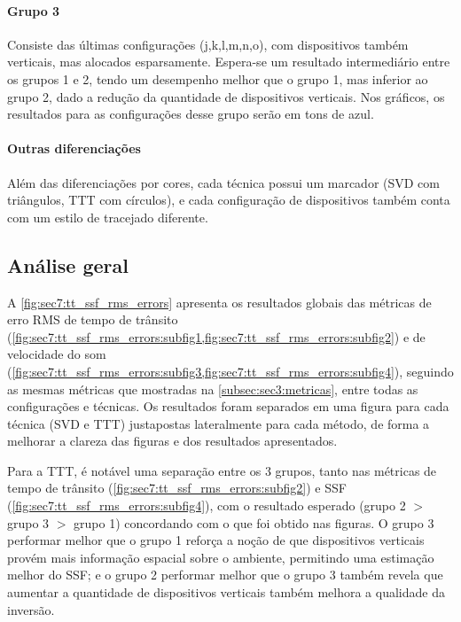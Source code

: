 \paragraph{Grupo 3}
Consiste das últimas configurações (j,k,l,m,n,o), com dispositivos também verticais, mas alocados esparsamente. Espera-se um resultado intermediário entre os grupos 1 e 2, tendo um desempenho melhor que o grupo 1, mas inferior ao grupo 2, dado a redução da quantidade de dispositivos verticais. Nos gráficos, os resultados para as configurações desse grupo serão em tons de azul.

\paragraph{Outras diferenciações}

Além das diferenciações por cores, cada técnica possui um marcador (SVD com triângulos, TTT com círculos), e cada configuração de dispositivos também conta com um estilo de tracejado diferente.

\subsection{Análise geral}

A \cref{fig:sec7:tt_ssf_rms_errors} apresenta os resultados globais das métricas de erro RMS de tempo de trânsito (\cref{fig:sec7:tt_ssf_rms_errors:subfig1,fig:sec7:tt_ssf_rms_errors:subfig2}) e de velocidade do som (\cref{fig:sec7:tt_ssf_rms_errors:subfig3,fig:sec7:tt_ssf_rms_errors:subfig4}), seguindo as mesmas métricas que mostradas na \cref{subsec:sec3:metricas}, entre todas as configurações e técnicas. Os resultados foram separados em uma figura para cada técnica (SVD e TTT) justapostas lateralmente para cada método, de forma a melhorar a clareza das figuras e dos resultados apresentados.


%
\const Para a TTT, é notável uma separação entre os 3 grupos, tanto nas métricas de tempo de trânsito (\cref{fig:sec7:tt_ssf_rms_errors:subfig2}) e SSF (\cref{fig:sec7:tt_ssf_rms_errors:subfig4}), com o resultado esperado (grupo 2 $>$ grupo 3 $>$ grupo 1) concordando com o que foi obtido nas figuras. O grupo 3 performar melhor que o grupo 1 reforça a noção de que dispositivos verticais provém mais informação espacial sobre o ambiente, permitindo uma estimação melhor do SSF; e o grupo 2 performar melhor que o grupo 3 também revela que aumentar a quantidade de dispositivos verticais também melhora a qualidade da inversão.

